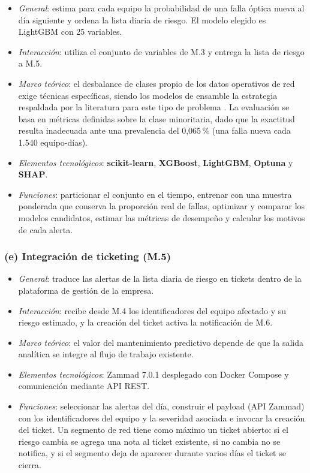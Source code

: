 \documentclass[12pt,a4paper]{article}
\begin{document}
\begin{itemize}
    \item \textit{General}: estima para cada equipo la probabilidad de una falla óptica nueva al día siguiente y ordena la lista diaria de riesgo. El modelo elegido es LightGBM con 25 variables.
    \item \textit{Interacción}: utiliza el conjunto de variables de M.3 y entrega la lista de riesgo a M.5.
    \item \textit{Marco teórico}: el desbalance de clases propio de los datos operativos de red exige técnicas específicas, siendo los modelos de ensamble la estrategia respaldada por la literatura para este tipo de problema \cite{stacking_ensemble}. La evaluación se basa en métricas definidas sobre la clase minoritaria, dado que la exactitud resulta inadecuada ante una prevalencia del 0,065\,\% (una falla nueva cada 1.540 equipo-días).
    \item \textit{Elementos tecnológicos}: \textbf{scikit-learn}, \textbf{XGBoost}, \textbf{LightGBM}, \textbf{Optuna} y \textbf{SHAP}.
    \item \textit{Funciones}: particionar el conjunto en el tiempo, entrenar con una muestra ponderada que conserva la proporción real de fallas, optimizar y comparar los modelos candidatos, estimar las métricas de desempeño y calcular los motivos de cada alerta.
\end{itemize}

\subsubsection*{(e) Integración de ticketing (M.5)}
 
\begin{itemize}
    \item \textit{General}: traduce las alertas de la lista diaria de riesgo en tickets dentro de la plataforma de gestión de la empresa.
    \item \textit{Interacción}: recibe desde M.4 los identificadores del equipo afectado y su riesgo estimado, y la creación del ticket activa la notificación de M.6.
    \item \textit{Marco teórico}: el valor del mantenimiento predictivo depende de que la salida analítica se integre al flujo de trabajo existente.
    \item \textit{Elementos tecnológicos}: Zammad 7.0.1 desplegado con Docker Compose y comunicación mediante API REST.
    \item \textit{Funciones}: seleccionar las alertas del día, construir el payload (API Zammad) con los identificadores del equipo y la severidad asociada e invocar la creación del ticket. Un segmento de red tiene como máximo un ticket abierto: si el riesgo cambia se agrega una nota al ticket existente, si no cambia no se notifica, y si el segmento deja de aparecer durante varios días el ticket se cierra.
\end{itemize}
\end{document}
